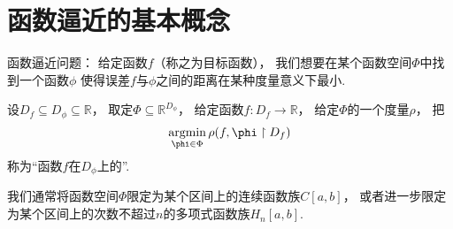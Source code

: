 \section{函数逼近的基本概念}
函数逼近问题：
给定函数\(f\)（称之为目标函数），
我们想要在某个函数空间\(\Phi\)中找到一个函数\(\phi\)
使得误差\(f\)与\(\phi\)之间的距离在某种度量意义下最小.
\begin{definition}
设\(D_f \subseteq D_\phi \subseteq \mathbb{R}\)，
取定\(\Phi \subseteq \mathbb{R}^{D_\phi}\)，
给定函数\(f\colon D_f \to \mathbb{R}\)，
给定\(\Phi\)的一个度量\(\rho\)，
把\begin{equation*}
	\argmin_{\phi \in \Phi} \rho(f,\phi \SetRestrict D_f)
\end{equation*}
称为“函数\(f\)在\(D_\phi\)上的”.
\end{definition}

我们通常将函数空间\(\Phi\)限定为某个区间上的连续函数族\(C[a,b]\)，
或者进一步限定为某个区间上的次数不超过\(n\)的多项式函数族\(H_n[a,b]\).
